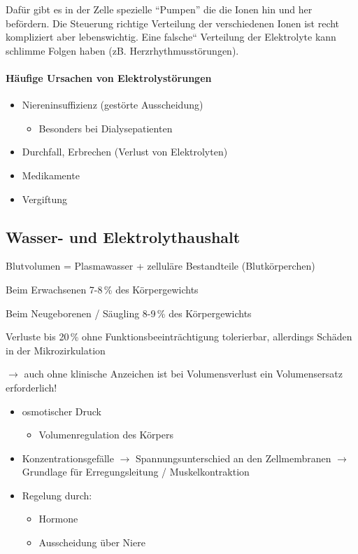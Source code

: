 Daf\"ur gibt es in der Zelle spezielle "`Pumpen"'
 die die Ionen hin und her
bef\"ordern. Die Steuerung richtige Verteilung der verschiedenen Ionen ist recht kompliziert aber lebenswichtig. Eine {\quotedblbase}falsche{\textquotedblleft} Verteilung der Elektrolyte
kann schlimme Folgen haben (zB. Herzrhythmusst\"orungen). 


\paragraph{H\"aufige Ursachen von
Elektrolyst\"orungen}

\begin{itemize}
    \item Niereninsuffizienz (gest\"orte Ausscheidung)
    \begin{itemize}
        \item Besonders bei Dialysepatienten
    \end{itemize}
    \item Durchfall, Erbrechen (Verlust von Elektrolyten)
    \item Medikamente
    \item Vergiftung
\end{itemize}



\subsection{Wasser- und Elektrolythaushalt}

Blutvolumen = Plasmawasser + zellul\"are Bestandteile (Blutk\"orperchen)

Beim Erwachsenen 7-8\,\% des Körpergewichts

Beim Neugeborenen / S\"augling 8-9\,\% des Körpergewichts  

Verluste bis 20\,\% ohne Funktionsbeeintr\"achtigung
tolerierbar, allerdings Sch\"aden in der  Mikrozirkulation

${\rightarrow}$ auch ohne klinische Anzeichen ist bei
Volumensverlust ein Volumensersatz erforderlich!

\begin{itemize}
    \item osmotischer Druck
    \begin{itemize}
        \item Volumenregulation des K\"orpers
    \end{itemize}
    \item Konzentrationsgef\"alle ${\rightarrow}$ Spannungsunterschied an
    den Zellmembranen ${\rightarrow}$ Grundlage f\"ur Erregungsleitung /
    Muskelkontraktion
    \item Regelung durch:
    \begin{itemize}
        \item Hormone 
        \item Ausscheidung \"uber Niere
    \end{itemize}
\end{itemize}

